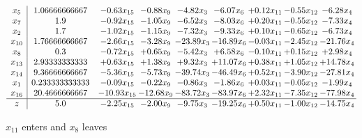 \documentclass[9pt]{article}
\begin{document}
 \[\begin{array}{c| c c@{\hskip 2pt} c@{\hskip 2pt} c@{\hskip 2pt} c@{\hskip 2pt} c@{\hskip 2pt} c@{\hskip 2pt} c@{\hskip 2pt} }
 x_{5}   &  1.06666666667 & -0.63 x_{15} & -0.88 x_{9} & -4.82 x_{3} & -6.07 x_{6} & +  0.12 x_{11} & -0.55 x_{12} & -6.28 x_{4}\\
 x_{7}   &  1.9 & -0.92 x_{15} & -1.05 x_{9} & -6.52 x_{3} & -8.03 x_{6} & +  0.20 x_{11} & -0.55 x_{12} & -7.33 x_{4}\\
 x_{2}   &  1.7 & -1.02 x_{15} & -1.15 x_{9} & -7.32 x_{3} & -9.33 x_{6} & +  0.10 x_{11} & -0.65 x_{12} & -6.73 x_{4}\\
 x_{10}   &  1.76666666667 & -2.66 x_{15} & -3.28 x_{9} & -23.89 x_{3} & -16.89 x_{6} & -0.03 x_{11} & -2.45 x_{12} & -21.76 x_{4}\\
 x_{8}   &  0.3 & -0.72 x_{15} & +  0.65 x_{9} & -5.42 x_{3} & +  6.58 x_{6} & -0.10 x_{11} & +  0.15 x_{12} & +  2.98 x_{4}\\
 x_{13}   &  2.93333333333 & +  0.63 x_{15} & +  1.38 x_{9} & +  9.32 x_{3} & + 11.07 x_{6} & +  0.38 x_{11} & +  1.05 x_{12} & + 14.78 x_{4}\\
 x_{14}   &  9.36666666667 & -5.36 x_{15} & -5.73 x_{9} & -39.74 x_{3} & -46.49 x_{6} & +  0.52 x_{11} & -3.90 x_{12} & -27.81 x_{4}\\
 x_{1}   &  0.233333333333 & -0.09 x_{15} & -0.22 x_{9} & -0.86 x_{3} & -1.86 x_{6} & +  0.03 x_{11} & -0.05 x_{12} & -1.99 x_{4}\\
 x_{16}   &  20.4666666667 & -10.93 x_{15} & -12.68 x_{9} & -83.72 x_{3} & -83.97 x_{6} & +  2.32 x_{11} & -7.35 x_{12} & -77.98 x_{4}\\
\hline
z    &  5.0 & -2.25 x_{15} & -2.00 x_{9} & -9.75 x_{3} & -19.25 x_{6} & +  0.50 x_{11} & -1.00 x_{12} & -14.75 x_{4}\\
\end{array}\]


 $ x_{11} $ enters and $ x_{8} $ leaves 
\end{document}
